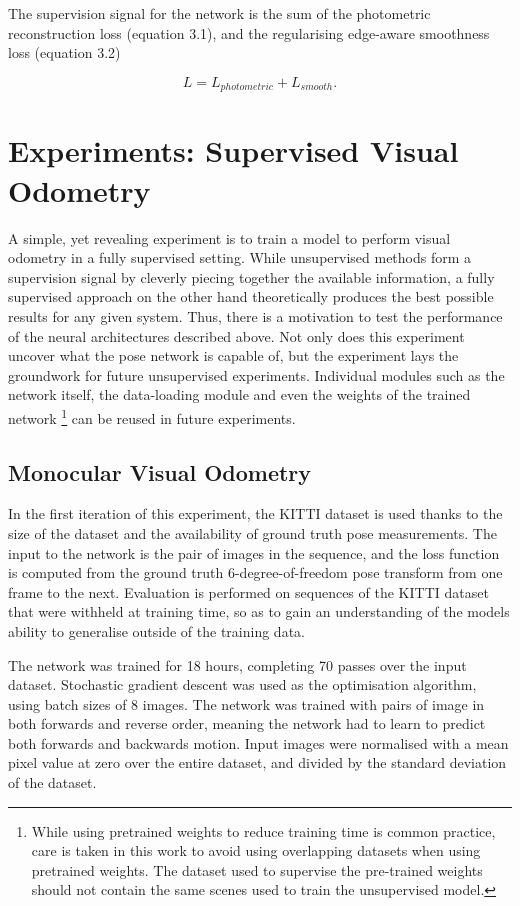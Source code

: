 The supervision signal for the network is the sum of the photometric reconstruction loss (equation 3.1), and the regularising edge-aware smoothness loss (equation 3.2)

\begin{equation}
    L = L_{photometric} + L_{smooth}.
\end{equation}



\section{Experiments: Supervised Visual Odometry}

A simple, yet revealing experiment is to train a model to perform visual odometry in a fully supervised setting. While unsupervised methods form a supervision signal by cleverly piecing together the available information, a fully supervised approach on the other hand theoretically produces the best possible results for any given system. Thus, there is a motivation to test the performance of the neural architectures described above. Not only does this experiment uncover what the pose network is capable of, but the experiment lays the groundwork for future unsupervised experiments. Individual modules such as the network itself, the data-loading module and even the weights of the trained network \footnote{While using pretrained weights to reduce training time is common practice, care is taken in this work to avoid using overlapping datasets when using pretrained weights. The dataset used to supervise the pre-trained weights should not contain the same scenes used to train the unsupervised model.} can be reused in future experiments. 

\subsection{Monocular Visual Odometry}

In the first iteration of this experiment, the KITTI dataset is used thanks to the size of the dataset and the availability of ground truth pose measurements. The input to the network is the pair of images in the sequence, and the loss function is computed from the ground truth 6-degree-of-freedom pose transform from one frame to the next. Evaluation is performed on sequences of the KITTI dataset that were withheld at training time, so as to gain an understanding of the models ability to generalise outside of the training data. 

The network was trained for 18 hours, completing 70 passes over the input dataset. Stochastic gradient descent was used as the optimisation algorithm, using batch sizes of 8 images. The network was trained with pairs of image in both forwards and reverse order, meaning the network had to learn to predict both forwards and backwards motion. Input images were normalised with a mean pixel value at zero over the entire dataset, and divided by the standard deviation of the dataset. 


